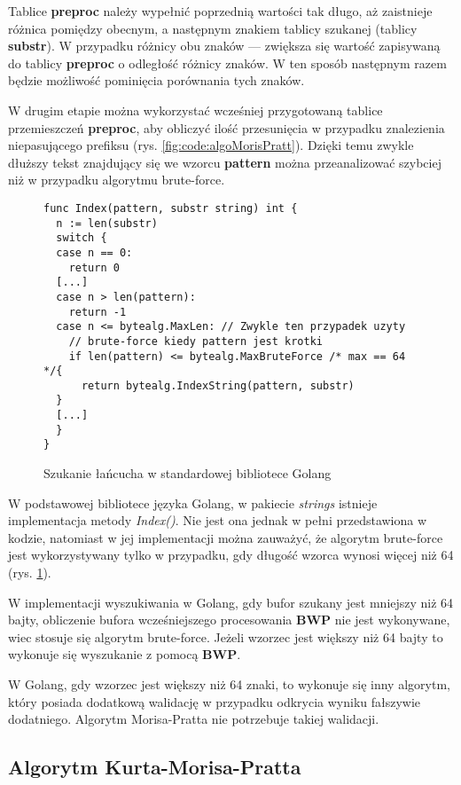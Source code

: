Tablice \textbf{preproc} należy wypełnić poprzednią wartości tak długo, aż zaistnieje
różnica pomiędzy obecnym, a następnym znakiem tablicy szukanej (tablicy 
\textbf{substr}). W przypadku różnicy obu znaków — zwiększa się wartość zapisywaną 
do tablicy \textbf{preproc} o odległość różnicy znaków. W ten sposób następnym
 razem będzie możliwość pominięcia porównania tych znaków.

W drugim etapie można wykorzystać wcześniej przygotowaną tablice przemieszczeń 
\textbf{preproc}, aby obliczyć ilość przesunięcia w przypadku znalezienia 
niepasującego prefiksu (rys. \ref{fig:code:algoMorisPratt}). Dzięki temu zwykle 
dłuższy tekst znajdujący się we wzorcu \textbf{pattern} można przeanalizować szybciej
niż w przypadku algorytmu brute-force.

\begin{figure}[htbp]
    \centering
\begin{lstlisting}
func Index(pattern, substr string) int {
  n := len(substr)
  switch {
  case n == 0:
    return 0
  [...]
  case n > len(pattern):
    return -1
  case n <= bytealg.MaxLen: // Zwykle ten przypadek uzyty
    // brute-force kiedy pattern jest krotki
    if len(pattern) <= bytealg.MaxBruteForce /* max == 64 */{
      return bytealg.IndexString(pattern, substr)
  }
  [...]
  }
}
\end{lstlisting}
\caption{Szukanie łańcucha w standardowej bibliotece Golang}
\label{fig:code:golangSearchInsideString}
\end{figure}
W podstawowej bibliotece języka Golang, w pakiecie \textit{strings} istnieje 
implementacja metody \textit{Index()}. Nie jest ona jednak w pełni przedstawiona
w kodzie, natomiast w jej implementacji można zauważyć, że algorytm brute-force
jest wykorzystywany tylko w przypadku, gdy długość wzorca wynosi więcej niż 64 
(rys. \ref{fig:code:golangSearchInsideString}).

W implementacji wyszukiwania w Golang, gdy bufor szukany jest mniejszy niż 64 bajty,
obliczenie bufora wcześniejszego procesowania \textbf{BWP} nie jest wykonywane, 
wiec stosuje się algorytm brute-force. Jeżeli wzorzec jest większy niż 64 
bajty to wykonuje się wyszukanie z pomocą \textbf{BWP}.

W Golang, gdy wzorzec jest większy niż
64 znaki, to wykonuje się inny algorytm, który posiada dodatkową walidację w
przypadku odkrycia wyniku fałszywie dodatniego. Algorytm Morisa-Pratta nie
 potrzebuje takiej walidacji.

\subsection{Algorytm Kurta-Morisa-Pratta}

